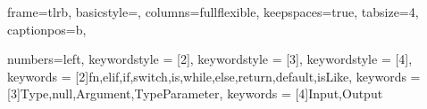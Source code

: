 

\makeatletter
\def\@makechapterhead#1{
  {\parindent \z@ \raggedright \normalfont
   \Huge\bfseries \thechapter. #1
   \par\nobreak
   \vskip 20\p@
}}
\def\@makeschapterhead#1{
  {\parindent \z@ \raggedright \normalfont
   \Huge\bfseries #1
   \par\nobreak
   \vskip 20\p@
}}
\makeatother

\def\chapwithtoc#1{
\chapter*{#1}
\addcontentsline{toc}{chapter}{#1}
}

\overfullrule=1mm


\theoremstyle{plain}
\newtheorem{defn}{Definition}
\newtheorem{obs}{Observation}

\newcommand{\pulrad}[1]{\raisebox{1.5ex}[0pt]{#1}}
\newcommand{\mc}[1]{\multicolumn{1}{c}{#1}}


\lstset
{
	frame=tlrb,
	basicstyle=\ttfamily,
  	columns=fullflexible,
  	keepspaces=true,
	tabsize=4,
	captionpos=b,
}




{
	numbers=left,
    keywordstyle = [2]{\color{key-color}},
    keywordstyle = [3]{\color{blue}},
    keywordstyle = [4]{\bfseries\color{black}},
    keywords = [2]{fn,elif,if,switch,is,while,else,return,default,isLike},
    keywords = [3]{Type,null,Argument,TypeParameter},
    keywords = [4]{Input,Output}
}

